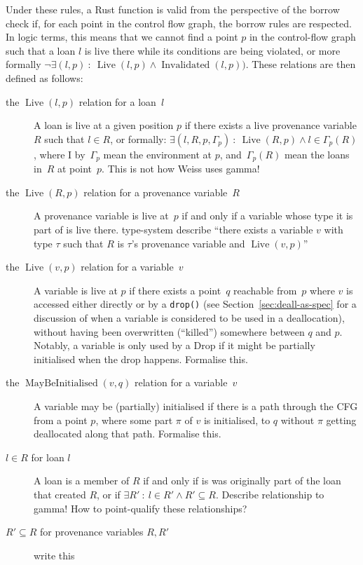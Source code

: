 \documentclass[11pt,a4paper,twoside,openany]{report}
\newcommand{\fixme}[1] {{\color{red}#1}}
\newcommand{\InRust}[1]{\texttt{#1}}
\newcommand{\Loan}[0]{l}
\DeclareMathOperator{\Live}{Live}
\DeclareMathOperator{\Invalidated}{Invalidated}
\DeclareMathOperator{\MayBeInitialised}{MayBeInitialised}
\begin{document}
Under these rules, a Rust function is valid from the perspective of the borrow
check if, for each point in the control flow graph, the borrow rules are
respected. In logic terms, this means that we cannot find a point $p$ in the
control-flow graph such that a loan $\Loan$ is live there while its conditions
are being violated, or more formally $\lnot \exists(\Loan, p) \: : \:
\Live(\Loan, p) \land \Invalidated(\Loan, p))$. These relations are then defined
as follows:
\begin{description}
\item[the $\Live(\Loan, p)$ relation for a loan~$\Loan$] A loan is live at a given
  position $p$ if there exists a live provenance variable $R$ such that $\Loan
  \in R$, or formally: $\exists(\Loan, R, p, \Gamma_p) \: : \: \Live(R, p) \land
  \Loan \in \Gamma_p(R)$, where I by~$\Gamma_p$ mean the environment at $p$,
  and~$\Gamma_p(R)$ mean the loans in~$R$ at point~$p$. \fixme{This is not how
    Weiss uses gamma!}
\item[the $\Live(R, p)$ relation for a provenance variable~$R$] A provenance
  variable is live at~$p$ if and only if a variable whose type it is part of is
  live there. \fixme{type-system describe ``there exists a variable $v$ with
    type $\tau$ such that $R$ is $\tau$'s provenance variable and $\Live(v,
    p)$''}
\item[the $\Live(v, p)$ relation for a variable~$v$] A variable is live at $p$
  if there exists a point~$q$ reachable from~$p$ where $v$ is accessed either
  directly or by a \InRust{drop()} (see Section~\ref{sec:deall-as-spec} for a
  discussion of when a variable is considered to be used in a deallocation),
  without having been overwritten (``killed'') somewhere between $q$ and $p$.
  Notably, a variable is only used by a Drop if it might be partially
  initialised when the drop happens. \fixme{Formalise this.}
\item[the $\MayBeInitialised(v, q)$ relation for a variable~$v$] A variable may
  be (partially) initialised if there is a path through the CFG from a point
  $p$, where some part $\pi$ of $v$ is initialised, to $q$ without $\pi$ getting
  deallocated along that path. \fixme{Formalise this.}
\item[$\Loan \in R$ for loan $\Loan$] A loan is a member of $R$ if and only if is
  was originally part of the loan that created $R$, or if $\exists R' \: :
  \:\Loan \in R' \land R' \subseteq R$. \fixme{Describe relationship to gamma!}
  \fixme{How to point-qualify these relationships?}
  \item[$R' \subseteq R$ for provenance variables $R, R'$] \fixme{write this}
\end{description}
\end{document}
